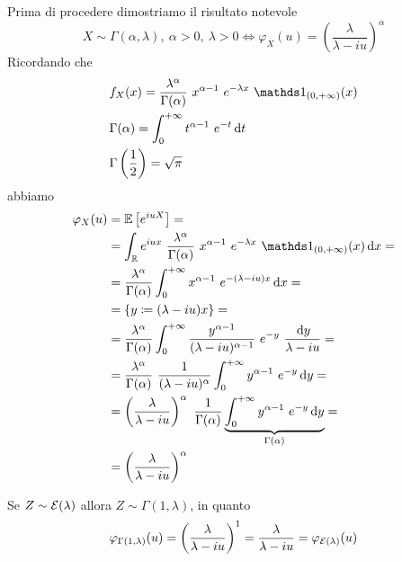 \Soluzione{} %
Prima di procedere dimostriamo il risultato notevole
\[
X\sim\Gamma(\alpha,\lambda),\ \alpha>0,\ \lambda>0\iff\varphi_X(u)=\left( \frac{\lambda}{\lambda-iu} \right)^\alpha
\]
Ricordando che
\begin{gather*}
\begin{aligned}
&f_X(x)=\frac{\lambda^\alpha}{\Gamma(\alpha)}\ x^{\alpha-1}\ e^{-\lambda x}\ \Ind_{(0,+\infty)}(x) \\
&\Gamma(\alpha)=\int_{0}^{+\infty} t^{\alpha-1}\ e^{-t}\dt \\
&\Gamma\left(\frac{1}{2}\right)=\sqrt{\pi}
\end{aligned}
\end{gather*}
abbiamo
\begin{gather*}
\begin{aligned}
\varphi_X(u)&=\EE\left[e^{iuX}  \right]=\\
&=\int_\RR e^{iux}\ \frac{\lambda^\alpha}{\Gamma(\alpha)}\ x^{\alpha-1}\ e^{-\lambda x}\ \Ind_{(0,+\infty)}(x)\dx=\\
&=\frac{\lambda^\alpha}{\Gamma(\alpha)}\int_{0}^{+\infty} x^{\alpha-1}\ e^{-(\lambda-iu) x}\dx=\\
&=\{ y\coloneqq(\lambda-iu)x \}=\\
&=\frac{\lambda^\alpha}{\Gamma(\alpha)}\int_{0}^{+\infty} \frac{y^{\alpha-1}}{(\lambda-iu)^{\alpha-1}}\ e^{-y}\ \frac{\dy}{\lambda-iu}=\\
&=\frac{\lambda^\alpha}{\Gamma(\alpha)}\ \frac{1}{(\lambda-iu)^{\alpha}}\int_{0}^{+\infty} y^{\alpha-1}\ e^{-y}\dy =\\
&=\left(\frac{\lambda}{\lambda-iu}\right)^\alpha\ \frac{1}{\Gamma(\alpha)}\underbrace{\int_{0}^{+\infty} y^{\alpha-1}\ e^{-y}\dy}_{\Gamma(\alpha)}=\\
&=\left(\frac{\lambda}{\lambda-iu}\right)^\alpha
\end{aligned}
\end{gather*}
\begin{oss}
Se $Z\sim\mathcal{E}(\lambda)$ allora $Z\sim\Gamma(1,\lambda)$, in quanto
\[
\varphi_{\Gamma(1,\lambda)}(u)=\left(\frac{\lambda}{\lambda-iu}\right)^1=\frac{\lambda}{\lambda-iu}=\varphi_{\mathcal{E}(\lambda)}(u)
\]
\end{oss}
